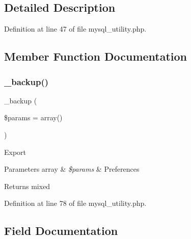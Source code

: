 \subsection{Detailed Description}


Definition at line 47 of file mysql\+\_\+utility.\+php.



\subsection{Member Function Documentation}
\mbox{\label{class_c_i___d_b__mysql__utility_a30f3053d2c82e7562349924363507afa}} 
\subsubsection{\texorpdfstring{\_backup()}{\_backup()}}
{\footnotesize\ttfamily \+\_\+backup (\begin{DoxyParamCaption}\item[{}]{\$params = {\ttfamily array()} }\end{DoxyParamCaption})\hspace{0.3cm}{\ttfamily [protected]}}

Export


\begin{DoxyParams}[1]{Parameters}
array & {\em \$params} & Preferences \\
\hline
\end{DoxyParams}
\begin{DoxyReturn}{Returns}
mixed 
\end{DoxyReturn}


Definition at line 78 of file mysql\+\_\+utility.\+php.



\subsection{Field Documentation}
\mbox{\label{class_c_i___d_b__mysql__utility_afe3a5b80562d93d6bc7e2b53c95b7e5a}} 
